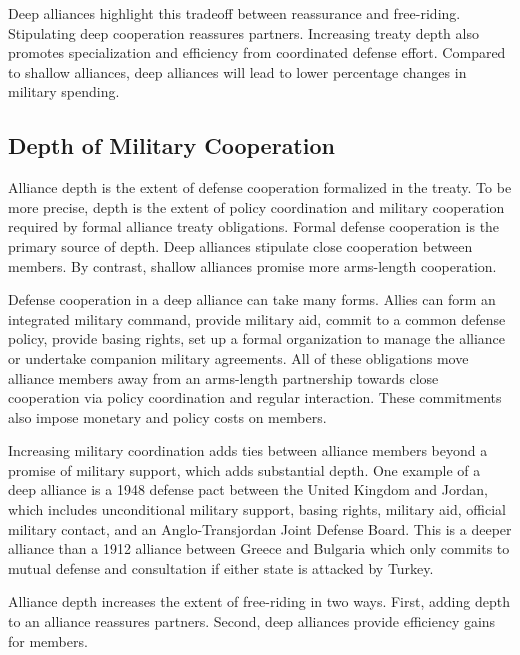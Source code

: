 \documentclass[12pt]{article}
\begin{document}
Deep alliances highlight this tradeoff between reassurance and free-riding. 
Stipulating deep cooperation reassures partners. 
Increasing treaty depth also promotes specialization and efficiency from coordinated defense effort.
Compared to shallow alliances, deep alliances will lead to lower percentage changes in military spending. 



\subsection{Depth of Military Cooperation} 


Alliance depth is the extent of defense cooperation formalized in the treaty. 
To be more precise, depth is the extent of policy coordination and military cooperation required by formal alliance treaty obligations. 
Formal defense cooperation is the primary source of depth. 
Deep alliances stipulate close cooperation between members.
By contrast, shallow alliances promise more arms-length cooperation. 


Defense cooperation in a deep alliance can take many forms. 
Allies can form an integrated military command, provide military aid, commit to a common defense policy, provide basing rights, set up a formal organization to manage the alliance or undertake companion military agreements. 
All of these obligations move alliance members away from an arms-length partnership towards close cooperation via policy coordination and regular interaction. 
These commitments also impose monetary and policy costs on members. 


Increasing military coordination adds ties between alliance members beyond a promise of military support, which adds substantial depth. 
One example of a deep alliance is a 1948 defense pact between the United Kingdom and Jordan, which includes unconditional military support, basing rights, military aid, official military contact, and an Anglo-Transjordan Joint Defense Board.  
This is a deeper alliance than a 1912 alliance between Greece and Bulgaria which only commits to mutual defense and consultation if either state is attacked by Turkey. 


Alliance depth increases the extent of free-riding in two ways. 
First, adding depth to an alliance reassures partners.  
Second, deep alliances provide efficiency gains for members. 
\end{document}
